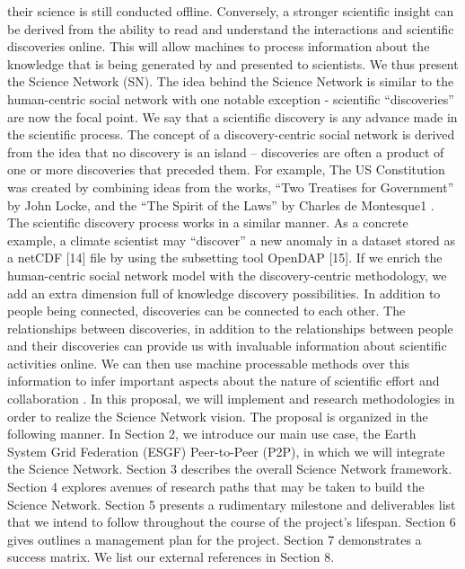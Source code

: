 their science is still conducted offline. Conversely, a stronger scientific insight can be derived from the
ability to read and understand the interactions and scientific discoveries online. This will allow machines
to process information about the knowledge that is being generated by and presented to scientists. We
thus present the Science Network (SN).
The idea behind the Science Network is similar to the human-centric social network with one notable
exception - scientific “discoveries” are now the focal point. We say that a scientific discovery is any
advance made in the scientific process. The concept of a discovery-centric social network is derived from
the idea that no discovery is an island -- discoveries are often a product of one or more discoveries that
preceded them. For example, The US Constitution was created by combining ideas from the works,
“Two Treatises for Government” by John Locke, and the “The Spirit of the Laws” by Charles de
Montesque1
. The scientific discovery process works in a similar manner. As a concrete example, a
climate scientist may “discover” a new anomaly in a dataset stored as a netCDF [14] file by using the
subsetting tool OpenDAP [15].
If we enrich the human-centric social network model with the discovery-centric methodology, we add an
extra dimension full of knowledge discovery possibilities. In addition to people being connected,
discoveries can be connected to each other. The relationships between discoveries, in addition to the
relationships between people and their discoveries can provide us with invaluable information about
scientific activities online. We can then use machine processable methods over this information to infer
important aspects about the nature of scientific effort and collaboration
.
In this proposal, we will implement and research methodologies in order to realize the Science Network vision. The proposal is organized in the following manner. In Section 2, we introduce our main use case, the Earth System Grid Federation (ESGF) Peer-to-Peer (P2P), in which we will integrate the Science Network. Section 3 describes the overall Science Network framework. Section 4 explores avenues of research paths that may be taken to build the Science Network. Section 5 presents a rudimentary milestone and deliverables list that we intend to follow throughout the course of the project’s lifespan.
Section 6 gives outlines a management plan for the project. Section 7 demonstrates a success matrix. We list our external references in Section 8.